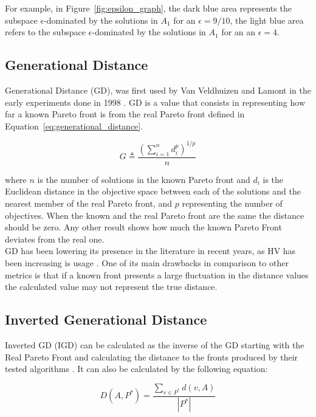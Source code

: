 For example, in Figure~\ref{fig:epsilon_graph}, the dark blue area represents the subspace $\epsilon$-dominated by the solutions in $A_{1}$ for an $\epsilon = 9/10$, the light blue area refers to the subspace $\epsilon$-dominated by the solutions in $A_{1}$ for an an $\epsilon = 4$.

\subsection{Generational Distance}

Generational Distance (GD), was first used by Van Veldhuizen and Lamont in the early experiments done in 1998 \cite{van1998evolutionary}. GD is a value that consists in representing how far a known Pareto front is from the real Pareto front defined in Equation~\ref{eq:generational_distance}.

\begin{equation}
G \triangleq \frac{\left(\sum_{i=1}^{n} d_{i}^{p}\right)^{1 / p}}{n}
\label{eq:generational_distance}
\end{equation}

where $n$ is the number of solutions in the known Pareto front and $d_i$ is the Euclidean distance in the objective space between each of the solutions and the nearest member of the real Pareto front, and $p$ representing the number of objectives. When the known and the real Pareto front are the same the distance should be zero. Any other result shows how much the known Pareto Front deviates from the real one. \\

GD has been lowering its presence in the literature in recent years, as HV has been increasing is usage \cite{riquelme2015performance}. One of its main drawbacks in comparison to other metrics is that if a known front presents a large fluctuation in the distance values the calculated value may not represent the true distance.

\subsection{Inverted Generational Distance}

Inverted GD (IGD) \cite{coello2004study} can be calculated as the inverse of the GD starting with the Real Pareto Front and calculating the distance to the fronts produced by their tested algorithms \cite{ishibuchi2015study}. It can also be calculated by the following equation:

\begin{equation}
D\left(A, P^{*}\right)=\frac{\sum_{v \in P^{*}} d(v, A)}{\left|P^{*}\right|}
\end{equation}


